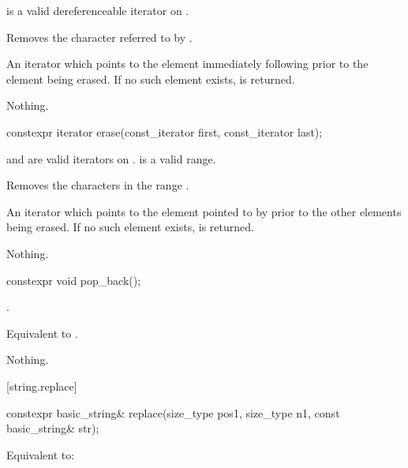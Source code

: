 \begin{itemdescr}
\pnum
\expects
{} is a valid dereferenceable iterator on .

\pnum
\effects
Removes the character referred to by .

\pnum
\returns
An iterator which points to the element immediately following  prior to
the element being erased.
If no such element exists,
is returned.

\pnum
\throws
Nothing.
\end{itemdescr}

%
\begin{itemdecl}
constexpr iterator erase(const_iterator first, const_iterator last);
\end{itemdecl}

\begin{itemdescr}
\pnum
\expects
{} and  are valid iterators on
.  is a valid range.

\pnum
\effects
Removes the characters in the range
\tcode{[first, last)}.

\pnum
\returns
An iterator which points to the element pointed to by  prior to
the other elements being erased.
If no such element exists,
is returned.

\pnum
\throws
Nothing.
\end{itemdescr}

%
\begin{itemdecl}
constexpr void pop_back();
\end{itemdecl}

\begin{itemdescr}
\pnum
\expects
{}.

\pnum
\effects
Equivalent to .

\pnum
\throws
Nothing.
\end{itemdescr}

[string.replace]{}

%
\begin{itemdecl}
constexpr basic_string& replace(size_type pos1, size_type n1, const basic_string& str);
\end{itemdecl}

\begin{itemdescr}
\pnum
\effects
Equivalent to: 
\end{itemdescr}

